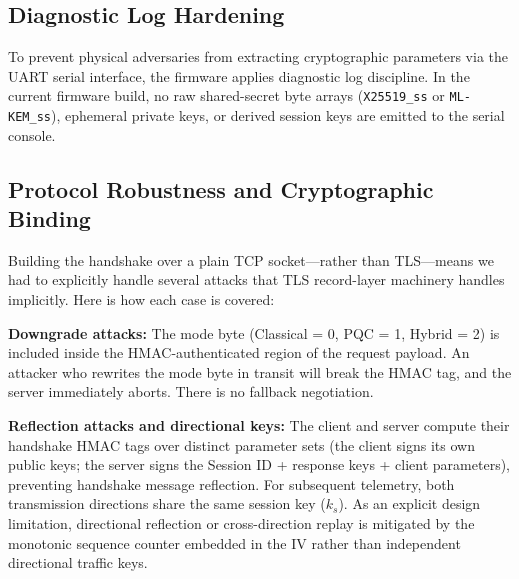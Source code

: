 \documentclass[journal, 10pt]{IEEEtran}
\begin{document}
\begin{table}[htbp]
\caption{IV and Key Lifecycle State Machine}
\begin{center}
\label{tab:lifecycle}
\end{center}
\end{table}

\subsection{Diagnostic Log Hardening}
To prevent physical adversaries from extracting cryptographic parameters via the UART serial interface, the firmware applies diagnostic log discipline. In the current firmware build, no raw shared-secret byte arrays (\texttt{X25519\_ss} or \texttt{ML-KEM\_ss}), ephemeral private keys, or derived session keys are emitted to the serial console.

\subsection{Protocol Robustness and Cryptographic Binding}
Building the handshake over a plain TCP socket—rather than TLS—means we had to explicitly handle several attacks that TLS record-layer machinery handles implicitly. Here is how each case is covered:

\textbf{Downgrade attacks:} The mode byte (Classical = 0, PQC = 1, Hybrid = 2) is included inside the HMAC-authenticated region of the request payload. An attacker who rewrites the mode byte in transit will break the HMAC tag, and the server immediately aborts. There is no fallback negotiation.

\textbf{Reflection attacks and directional keys:} The client and server compute their handshake HMAC tags over distinct parameter sets (the client signs its own public keys; the server signs the Session ID + response keys + client parameters), preventing handshake message reflection. For subsequent telemetry, both transmission directions share the same session key ($k_s$). As an explicit design limitation, directional reflection or cross-direction replay is mitigated by the monotonic sequence counter embedded in the IV rather than independent directional traffic keys.
\end{document}
